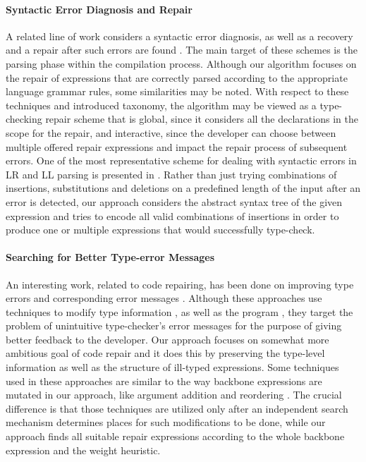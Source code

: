 \paragraph{{\bf Syntactic Error Diagnosis and Repair}}
A related line of work considers a syntactic error diagnosis, as well as a recovery and a repair after such errors are found \cite{Hammond198451,Degano:1998:LTH:2245729.2245835}.
The main target of these schemes is the parsing phase within the compilation process. 
Although our algorithm focuses on the repair of expressions that are correctly parsed
according to the appropriate language grammar rules, some similarities may be noted.
With respect to these techniques and introduced taxonomy, the \ourTool algorithm may be viewed
as a type-checking repair scheme that is global, since it considers all the declarations
in the scope for the repair, and interactive, since the developer can choose between multiple
offered repair expressions and impact the repair process of subsequent errors. 
One of the most representative scheme for dealing with syntactic errors in LR and LL
parsing is presented in \cite{Burke87apractical}.
Rather than just trying combinations of insertions, substitutions and deletions
on a predefined length of the input after an error is detected, our approach
considers the abstract syntax tree of the given expression and tries to encode all valid combinations of insertions in order to produce one
or multiple expressions that would successfully type-check.


\paragraph{{\bf Searching for Better Type-error Messages}}
An interesting work, related to code repairing, has been done on improving type
errors and corresponding error messages
\cite{McAdam01repairingtype,Lerner:2006:SSM:1159876.1159887,Lerner:2007:STM:1250734.1250783}.
Although these approaches use techniques
to modify type information \cite{McAdam01repairingtype}, as well as the program
\cite{Lerner:2007:STM:1250734.1250783}, they target the problem of
unintuitive type-checker's error messages for the purpose of giving better feedback to the developer.
Our approach focuses on somewhat more ambitious goal of code repair and it does
this by preserving the type-level information as well as the structure of
ill-typed expressions.
Some techniques used in these approaches are similar to the way backbone
expressions are mutated in our approach, like argument addition and reordering
\cite{Lerner:2007:STM:1250734.1250783}.
The crucial difference is that those techniques are utilized only after an
independent search mechanism determines places for such modifications to be
done, while our approach finds all suitable repair expressions according
to the whole backbone expression and the weight heuristic.

